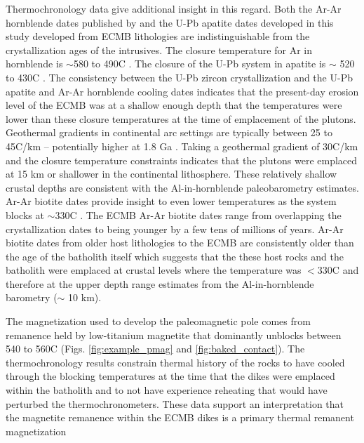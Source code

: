 \documentclass[draft]{agujournal2019}
\begin{document}
Thermochronology data give additional insight in this regard. Both the Ar-Ar hornblende dates published by  and the U-Pb apatite dates developed in this study developed from ECMB lithologies are indistinguishable from the crystallization ages of the intrusives. The closure temperature for Ar in hornblende is $\sim$580 to 490\textdegree C \cite{Harrison1982a}. The closure of the U-Pb system in apatite is $\sim$ 520 to 430\textdegree C \cite{Smye2018a}. The consistency between the U-Pb zircon crystallization and the U-Pb apatite and Ar-Ar hornblende cooling dates indicates that the present-day erosion level of the ECMB was at a shallow enough depth that the temperatures were lower than these closure temperatures at the time of emplacement of the plutons. Geothermal gradients in continental arc settings are typically between 25 to 45\textdegree C/km -- potentially higher at 1.8 Ga \cite{Rothstein2003a}. Taking a geothermal gradient of 30\textdegree C/km and the closure temperature constraints indicates that the plutons were emplaced at 15 km or shallower in the continental lithosphere. These relatively shallow crustal depths are consistent with the Al-in-hornblende paleobarometry estimates. Ar-Ar biotite dates provide insight to even lower temperatures as the system blocks at $\sim$330\textdegree C \cite{Grove2001a}. The ECMB Ar-Ar biotite dates range from overlapping the crystallization dates to being younger by a few tens of millions of years. Ar-Ar biotite dates from older host lithologies to the ECMB are consistently older than the age of the batholith itself which suggests that the these host rocks and the batholith were emplaced at crustal levels where the temperature was $<$330\textdegree C and therefore at the upper depth range estimates from the Al-in-hornblende barometry ($\sim$ 10 km). 

The magnetization used to develop the paleomagnetic pole comes from remanence held by low-titanium magnetite that dominantly unblocks between 540 to 560\textdegree C (Figs. \ref{fig:example_pmag} and \ref{fig:baked_contact}). The thermochronology results constrain thermal history of the rocks to have cooled through the blocking temperatures at the time that the dikes were emplaced within the batholith and to not have experience reheating that would have perturbed the thermochronometers. These data support an interpretation that the magnetite remanence within the ECMB dikes is a primary thermal remanent magnetization 
\end{document}
